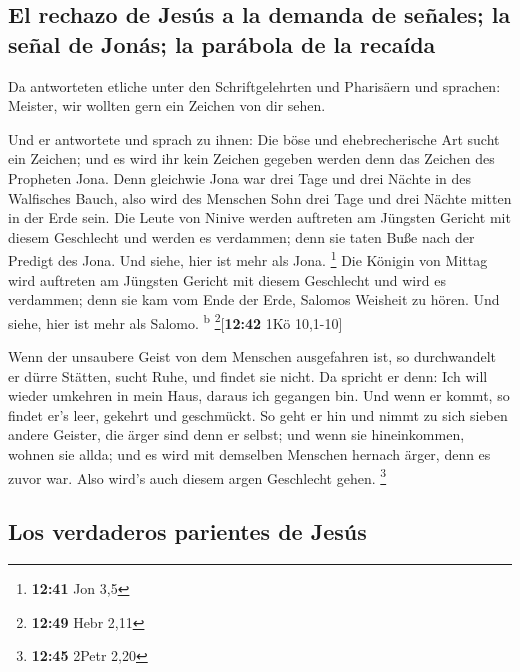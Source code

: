 \hypertarget{el-rechazo-de-jesuxfas-a-la-demanda-de-seuxf1ales-la-seuxf1al-de-jonuxe1s-la-paruxe1bola-de-la-recauxedda}{%
\subsection{El rechazo de Jesús a la demanda de señales; la señal de
Jonás; la parábola de la
recaída}\label{el-rechazo-de-jesuxfas-a-la-demanda-de-seuxf1ales-la-seuxf1al-de-jonuxe1s-la-paruxe1bola-de-la-recauxedda}}

 Da antworteten etliche unter den Schriftgelehrten und
Pharisäern und sprachen: Meister, wir wollten gern ein Zeichen von dir
sehen.

 Und er antwortete und sprach zu ihnen: Die böse und
ehebrecherische Art sucht ein Zeichen; und es wird ihr kein Zeichen
gegeben werden denn das Zeichen des Propheten Jona.  Denn
gleichwie Jona war drei Tage und drei Nächte in des Walfisches Bauch,
also wird des Menschen Sohn drei Tage und drei Nächte mitten in der Erde
sein.  Die Leute von Ninive werden auftreten am Jüngsten
Gericht mit diesem Geschlecht und werden es verdammen; denn sie taten
Buße nach der Predigt des Jona. Und siehe, hier ist mehr als Jona.
\footnote{\textbf{12:41} Jon 3,5}  Die Königin von Mittag
wird auftreten am Jüngsten Gericht mit diesem Geschlecht und wird es
verdammen; denn sie kam vom Ende der Erde, Salomos Weisheit zu hören.
Und siehe, hier ist mehr als Salomo. \textsuperscript{b}
\footnote{\textbf{12:49} Hebr 2,11}{[}\textbf{12:42} 1Kö 10,1-10{]}

 Wenn der unsaubere Geist von dem Menschen ausgefahren
ist, so durchwandelt er dürre Stätten, sucht Ruhe, und findet sie nicht.
 Da spricht er denn: Ich will wieder umkehren in mein
Haus, daraus ich gegangen bin. Und wenn er kommt, so findet er's leer,
gekehrt und geschmückt.  So geht er hin und nimmt zu sich
sieben andere Geister, die ärger sind denn er selbst; und wenn sie
hineinkommen, wohnen sie allda; und es wird mit demselben Menschen
hernach ärger, denn es zuvor war. Also wird's auch diesem argen
Geschlecht gehen. \footnote{\textbf{12:45} 2Petr 2,20}

\hypertarget{los-verdaderos-parientes-de-jesuxfas}{%
\subsection{Los verdaderos parientes de
Jesús}\label{los-verdaderos-parientes-de-jesuxfas}}

